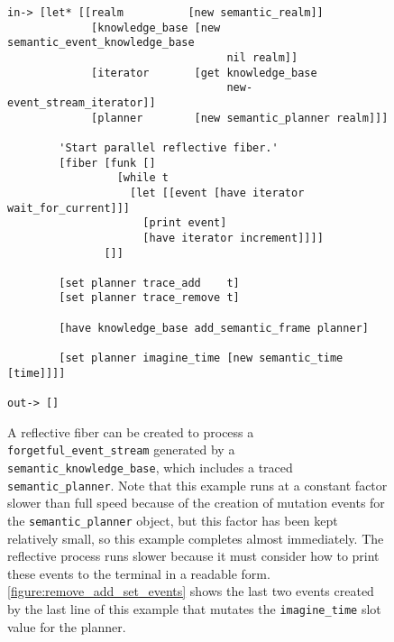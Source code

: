\begin{figure}[h]
\centering
{\small
\begin{Verbatim}[frame=single]
 in-> [let* [[realm          [new semantic_realm]]
             [knowledge_base [new semantic_event_knowledge_base
                                  nil realm]]
             [iterator       [get knowledge_base
                                  new-event_stream_iterator]]
             [planner        [new semantic_planner realm]]]

        'Start parallel reflective fiber.'
        [fiber [funk []
                 [while t
                   [let [[event [have iterator wait_for_current]]]
                     [print event]
                     [have iterator increment]]]]
               []]
        
        [set planner trace_add    t]
        [set planner trace_remove t]
        
        [have knowledge_base add_semantic_frame planner]
        
        [set planner imagine_time [new semantic_time [time]]]]

out-> []
\end{Verbatim}
}
\caption[A reflective fiber can be created to process an
  {\tt{forgetful\_event\_stream}}.]{A reflective fiber can be created
  to process a {\tt{forgetful\_event\_stream}} generated by a
  {\tt{semantic\_knowledge\_base}}, which includes a traced
  {\tt{semantic\_planner}}.  Note that this example runs at a constant
  factor slower than full speed because of the creation of mutation
  events for the {\tt{semantic\_planner}} object, but this factor has
  been kept relatively small, so this example completes almost
  immediately.  The reflective process runs slower because it must
  consider how to print these events to the terminal in a readable
  form.  {\mbox{\autoref{figure:remove_add_set_events}}} shows the
  last two events created by the last line of this example that
  mutates the {\tt{imagine\_time}} slot value for the planner.}
\label{figure:reflective_fiber}
\end{figure}

